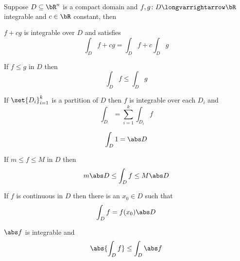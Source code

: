 \documentclass[10pt]{article}
\begin{document}
\begin{prop*}

    Suppose $D\subseteq\bR^n$ is a compact domain and $f,g\colon D\longvarrightarrow\bR$ integrable and $c\in\bR$ constant, then
    \benum
        \item $f+cg$ is integrable over $D$ and satisfies
            \[ \int_D f+cg = \int_D f + c\int_D g \]
        \item If $f\leq g$ in $D$ then
            \[ \int_D f \leq \int_D g \]
        \item If $\set{D_i}_{i=1}^k$ is a partition of $D$ then $f$ is integrable over each $D_i$ and
            \[ \int_D = \sum_{i=1}^k\int_{D_i}f \]
        \item
            \[ \int_D 1 = \abs D \]
        \item If $m\leq f\leq M$ in $D$ then
            \[ m\abs D\leq\int_D f\leq M\abs D \]
        \item If $f$ is continuous in $D$ then there is an $x_0\in D$ such that
             \[ \int_D f = f(x_0)\abs D \]
        \item $\abs f$ is integrable and
             \[ \abs{\int_D f} \leq \int_D\abs f \]
    \eenum

\end{prop*}
\end{document}
